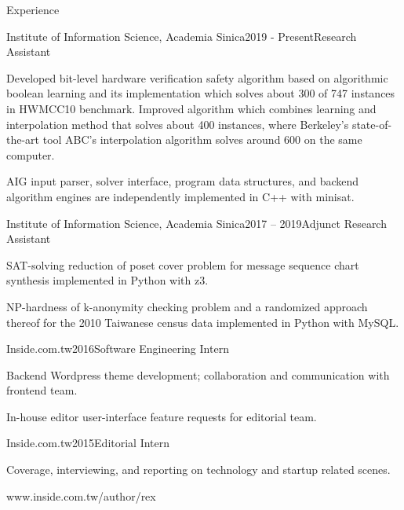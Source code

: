 \documentclass{resume} %
\begin{document}
\begin{rSection}{Experience}

\begin{rSubsection}{Institute of Information Science, Academia Sinica}{2019 - Present}{Research Assistant}{}
\item Developed bit-level hardware verification safety algorithm based on algorithmic boolean learning and
its implementation which solves about 300 of 747 instances in HWMCC10 benchmark.
Improved algorithm which combines learning and interpolation method that solves about 400 instances,
where Berkeley's state-of-the-art tool ABC's interpolation algorithm solves around 600 on the same computer.

AIG input parser, solver interface, program data structures, and backend algorithm engines
are independently implemented in C++ with minisat.
\end{rSubsection}


\begin{rSubsection}{Institute of Information Science, Academia Sinica}{2017 – 2019}{Adjunct Research Assistant}{}
\item SAT-solving reduction of poset cover problem for message sequence chart synthesis  implemented in Python with z3.
\item NP-hardness of k-anonymity checking problem and a randomized approach thereof for the 2010 Taiwanese census data
implemented in Python with MySQL.
\end{rSubsection}


\begin{rSubsection}{Inside.com.tw}{2016}{Software Engineering Intern}{}
\item Backend Wordpress theme development; collaboration  and communication with frontend team.
\item In-house editor user-interface feature requests for editorial team.
\end{rSubsection}


\begin{rSubsection}{Inside.com.tw}{2015}{Editorial Intern}{}
\item Coverage, interviewing, and reporting on technology and startup related scenes.
\item www.inside.com.tw/author/rex
\end{rSubsection}

\end{rSection}
\end{document}
